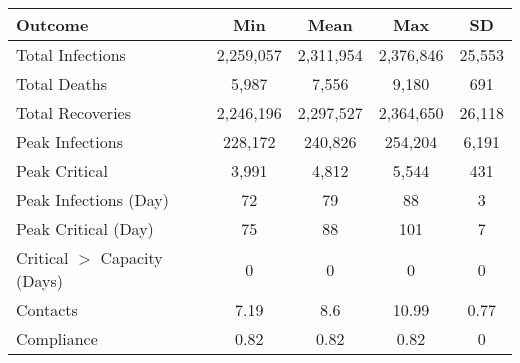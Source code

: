 \begin{table}[ht]
\centering
\begin{tabular}{lcccc}
  \hline
Outcome & Min & Mean & Max & SD \\ 
  \hline
Total Infections & 2,259,057 & 2,311,954 & 2,376,846 & 25,553 \\ 
  Total Deaths &     5,987 &     7,556 &     9,180 &    691 \\ 
  Total Recoveries & 2,246,196 & 2,297,527 & 2,364,650 & 26,118 \\ 
  Peak Infections &   228,172 &   240,826 &   254,204 &  6,191 \\ 
  Peak Critical &     3,991 &     4,812 &     5,544 &    431 \\ 
  Peak Infections (Day) & 72 & 79 & 88 & 3 \\ 
  Peak Critical (Day) & 75 & 88 & 101 & 7 \\ 
  Critical $>$ Capacity (Days) & 0 & 0 & 0 & 0 \\ 
  Contacts & 7.19 & 8.6 & 10.99 & 0.77 \\ 
  Compliance & 0.82 & 0.82 & 0.82 & 0 \\ 
   \hline
\end{tabular}
\end{table}
